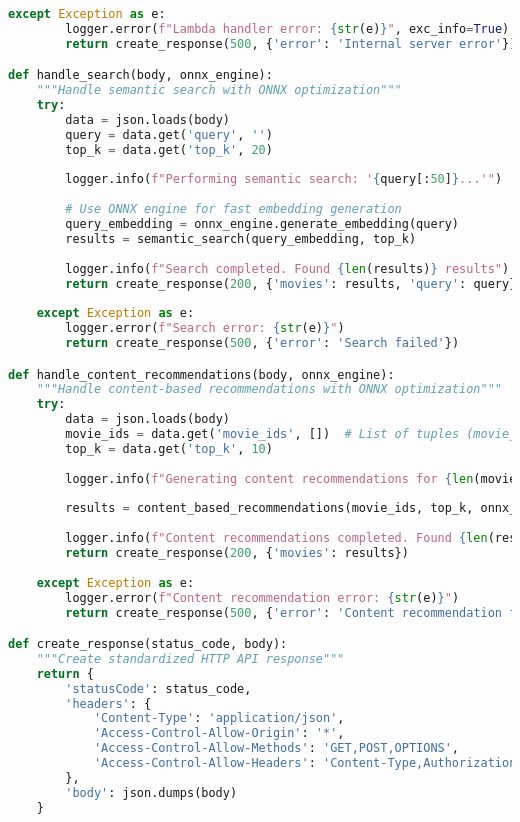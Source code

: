\documentclass[11pt,a4paper]{article}
\begin{document}
\begin{lstlisting}[language=Python, caption=Lambda Handler - Router Centralizzato]
    except Exception as e:
        logger.error(f"Lambda handler error: {str(e)}", exc_info=True)
        return create_response(500, {'error': 'Internal server error'})

def handle_search(body, onnx_engine):
    """Handle semantic search with ONNX optimization"""
    try:
        data = json.loads(body)
        query = data.get('query', '')
        top_k = data.get('top_k', 20)
        
        logger.info(f"Performing semantic search: '{query[:50]}...'")
        
        # Use ONNX engine for fast embedding generation
        query_embedding = onnx_engine.generate_embedding(query)
        results = semantic_search(query_embedding, top_k)
        
        logger.info(f"Search completed. Found {len(results)} results")
        return create_response(200, {'movies': results, 'query': query})
        
    except Exception as e:
        logger.error(f"Search error: {str(e)}")
        return create_response(500, {'error': 'Search failed'})

def handle_content_recommendations(body, onnx_engine):
    """Handle content-based recommendations with ONNX optimization"""
    try:
        data = json.loads(body)
        movie_ids = data.get('movie_ids', [])  # List of tuples (movie_id, rating)
        top_k = data.get('top_k', 10)
        
        logger.info(f"Generating content recommendations for {len(movie_ids)} movies")
        
        results = content_based_recommendations(movie_ids, top_k, onnx_engine)
        
        logger.info(f"Content recommendations completed. Found {len(results)} results")
        return create_response(200, {'movies': results})
        
    except Exception as e:
        logger.error(f"Content recommendation error: {str(e)}")
        return create_response(500, {'error': 'Content recommendation failed'})

def create_response(status_code, body):
    """Create standardized HTTP API response"""
    return {
        'statusCode': status_code,
        'headers': {
            'Content-Type': 'application/json',
            'Access-Control-Allow-Origin': '*',
            'Access-Control-Allow-Methods': 'GET,POST,OPTIONS',
            'Access-Control-Allow-Headers': 'Content-Type,Authorization'
        },
        'body': json.dumps(body)
    }
\end{lstlisting}
\end{document}
